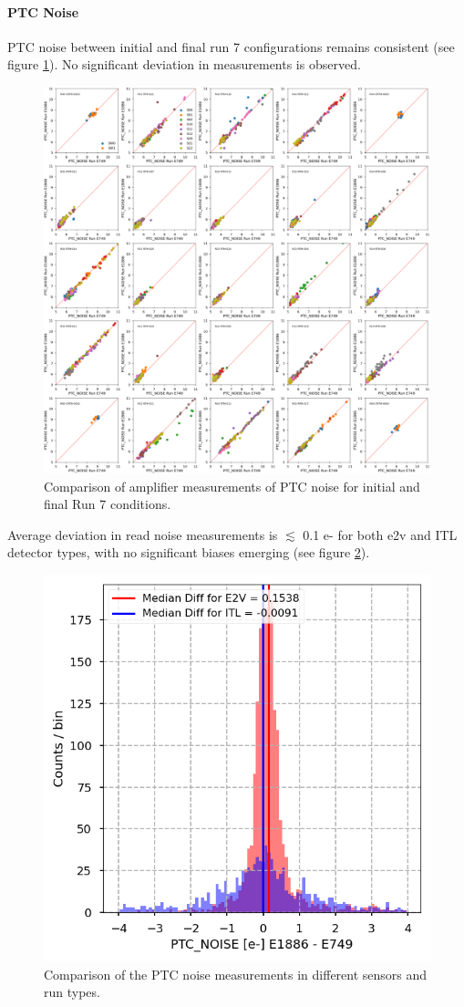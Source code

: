 \paragraph{PTC Noise}\label{sec:finalChar:PTCNoise}

PTC noise between initial and final run 7 configurations remains consistent (see figure \ref{fig:finalChar-PTC_noise_5x5}). No significant deviation in measurements is observed.

\begin{figure}[ht]
    \centering
    \includegraphics[width=0.7\linewidth]{figures/finalCharacterization/E749_E1886_PTC_NOISE.png}
    \caption{Comparison of amplifier measurements of PTC noise for initial and final Run 7 conditions.}
    \label{fig:finalChar-PTC_noise_5x5}
\end{figure}

Average deviation in read noise measurements is $\lesssim$ 0.1 e- for both e2v and ITL detector types, with no significant biases emerging (see figure \ref{fig:finalChar:PTCNoise_diff_hist}).

\begin{figure}[ht]
    \centering
    \includegraphics[width=0.7\linewidth]{figures/finalCharacterization/PTC_NOISE_E749_E1886_diff.png}
    \caption{Comparison of the PTC noise measurements in different sensors and run types.}
    \label{fig:finalChar:PTCNoise_diff_hist}
\end{figure}

